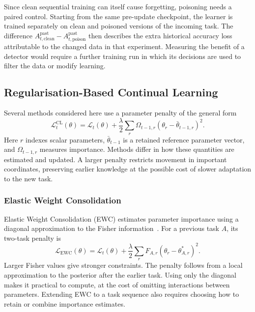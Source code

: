 Since clean sequential training can itself cause forgetting, poisoning needs
a paired control. Starting from the same pre-update checkpoint, the learner
is trained separately on clean and poisoned versions of the incoming task.
The difference
$A_{t,\mathrm{clean}}^{\mathrm{past}}-
 A_{t,\mathrm{poison}}^{\mathrm{past}}$ then describes the extra historical
accuracy loss attributable to the changed data in that experiment. Measuring
the benefit of a detector would require a further training run in which its
decisions are used to filter the data or modify learning.

\subsection{Regularisation-Based Continual Learning}
\label{subsec:bg-regularisation}

Several methods considered here use a parameter penalty of the general form
\begin{equation}
    \mathcal{L}_t^{\mathrm{CL}}(\theta)
    = \mathcal{L}_t(\theta)
      +\frac{\lambda}{2}\sum_r
       \Omega_{t-1,r}(\theta_r-\bar\theta_{t-1,r})^2.
    \label{eq:bg-regularisation}
\end{equation}
Here $r$ indexes scalar parameters, $\bar\theta_{t-1}$ is a retained reference
parameter vector, and $\Omega_{t-1,r}$ measures importance. Methods differ
in how these quantities are estimated and updated. A larger penalty restricts
movement in important coordinates, preserving earlier knowledge at the
possible cost of slower adaptation to the new task.

\subsubsection{Elastic Weight Consolidation}

Elastic Weight Consolidation (EWC) estimates parameter importance using a
diagonal approximation to the Fisher information~\cite{kirkpatrick2017ewc}.
For a previous task $A$, its two-task penalty is
\begin{equation}
    \mathcal{L}_{\mathrm{EWC}}(\theta)
    = \mathcal{L}_t(\theta)
      +\frac{\lambda}{2}\sum_r
       F_{A,r}(\theta_r-\theta_{A,r}^{*})^2.
    \label{eq:bg-ewc}
\end{equation}
Larger Fisher values give stronger constraints. The penalty follows from a
local approximation to the posterior after the earlier task. Using only the
diagonal makes it practical to compute, at the cost of omitting interactions
between parameters. Extending EWC to a task sequence also requires choosing
how to retain or combine importance estimates.

